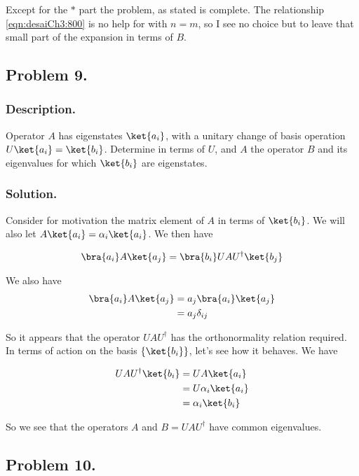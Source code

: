 Except for the $\text{*}$ part the problem, as stated is complete.  The relationship \ref{eqn:desaiCh3:800} is no help for with $n = m$, so I see no choice but to leave that small part of the expansion in terms of $B$.

\subsection{Problem 9. }
\subsubsection{Description. }

Operator $A$ has eigenstates $\ket{a_i}$, with a unitary change of basis operation $U \ket{a_i} = \ket{b_i}$.  Determine in terms of $U$, and $A$ the operator $B$ and its eigenvalues for which $\ket{b_i}$ are eigenstates.

\subsubsection{Solution. }

Consider for motivation the matrix element of $A$ in terms of $\ket{b_i}$.  We will also let $A \ket{a_i} = \alpha_i \ket{a_i}$.  We then have

\begin{align*}
\bra{a_i} A \ket{a_j}
&=
\bra{b_i} U A U^\dagger \ket{b_j} \\
\end{align*}

We also have
\begin{align*}
\bra{a_i} A \ket{a_j}
&=
a_j \bra{a_i} \ket{a_j} \\
&=
a_j \delta_{ij}
\end{align*}

So it appears that the operator $U A U^\dagger$ has the orthonormality relation required.  In terms of action on the basis $\{\ket{b_i}\}$, let's see how it behaves.  We have

\begin{align*}
U A U^\dagger \ket{b_i}
&= U A \ket{a_i} \\
&= U \alpha_i \ket{a_i} \\
&= \alpha_i \ket{b_i} \\
\end{align*}

So we see that the operators $A$ and $B = U A U^\dagger$ have common eigenvalues.

\subsection{Problem 10. }
